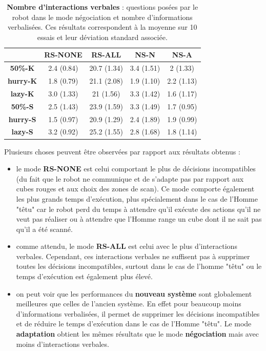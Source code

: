 \documentclass[english,a4paper,11pt,twoside]{StyleThese}
\begin{document}
\begin{table}[!h]
\centering
  \begin{tabular}{|c||c|c|c|c|}
  \hline
     & \textbf{RS-NONE} & \textbf{RS-ALL} & \textbf{NS-N} & \textbf{NS-A} \\
  \hline
  \hline
     \textbf{50\%-K} & 2.4 (0.84) & 20.7 (1.34) & 3.4 (1.51) & 2 (1.33) \\
  \hline
     \textbf{hurry-K} & 1.8 (0.79) & 21.1 (2.08) & 1.9 (1.10) & 2.2 (1.13) \\
  \hline
     \textbf{lazy-K} & 3.0 (1.33) & 21 (1.56) & 3.3 (1.42) & 1.6 (1.17) \\
  \hline
     \textbf{50\%-S} & 2.5 (1.43) & 23.9 (1.59) & 3.3 (1.49) & 1.7 (0.95)\\
  \hline
     \textbf{hurry-S} & 1.5 (0.97) & 20.9 (1.29) & 2.4 (1.89) & 1.9 (0.99)\\
  \hline
     \textbf{lazy-S} & 3.2 (0.92) & 25.2 (1.55) & 2.8 (1.68) & 1.8 (1.14)\\
  \hline
  \end{tabular}
   \caption{\textbf{Nombre d'interactions verbales} : questions posées par le robot dans le mode négociation et nombre d'informations verbalisées. Ces résultats correspondent à la moyenne sur 10 essais et leur déviation standard associée.}
   \label{tab:verbalInteraction}
\end{table}

Plusieurs choses peuvent être observées par rapport aux résultats obtenus :
\begin{itemize}
\item le mode \textbf{RS-NONE} est celui comportant le plus de décisions incompatibles (du fait que le robot ne communique et de s'adapte pas par rapport aux cubes rouges et aux choix des zones de scan). Ce mode comporte également les plus grands temps d'exécution, plus spécialement dans le cas de l'Homme "têtu" car le robot perd du temps à attendre qu'il exécute des actions qu'il ne veut pas réaliser ou à attendre que l'Homme range un cube dont il ne sait pas qu'il a été scanné.
\item comme attendu, le mode \textbf{RS-ALL} est celui avec le plus d'interactions verbales. Cependant, ces interactions verbales ne suffisent pas à supprimer toutes les décisions incompatibles, surtout dans le cas de l'homme "têtu" ou le temps d'exécution est également plus élevé.
\item on peut voir que les performances du \textbf{nouveau système} sont globalement meilleures que celles de l'ancien système. En effet pour beaucoup moins d'informations verbalisées, il permet de supprimer les décisions incompatibles et de réduire le temps d'exécution dans le cas de l'Homme "têtu". Le mode \textbf{adaptation} obtient les mêmes résultats que le mode \textbf{négociation} mais avec moins d'interactions verbales.
\end{itemize}
\end{document}
